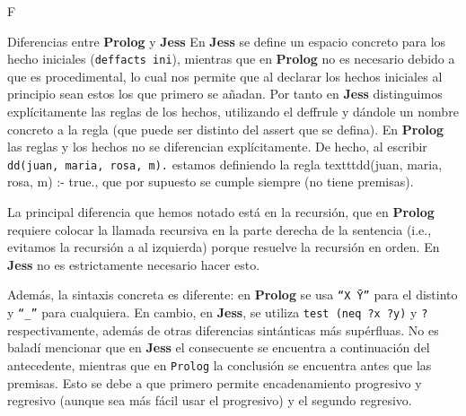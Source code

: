 F\documentclass[11pt, a4paper, spanish, openright, twoside]{book}
\begin{document}
\begin{section}{Diferencias entre \textbf{Prolog} y \textbf{Jess}}
		En \textbf{Jess} se define un espacio concreto para los hecho iniciales (\texttt{deffacts ini}), mientras que en \textbf{Prolog} no es necesario debido a que es procedimental, lo cual nos permite que 
		al declarar los hechos iniciales al principio sean estos los que primero se añadan.
		Por tanto en \textbf{Jess} distinguimos explícitamente las reglas de los hechos, utilizando el deffrule y dándole un nombre concreto a la regla (que puede ser distinto del assert que se defina). En \textbf{Prolog} las reglas 
		y los hechos no se diferencian explícitamente. De hecho, al escribir  \texttt{dd(juan, maria, rosa, m).} estamos definiendo la regla texttt{dd(juan, maria, rosa, m) :- true.}, que por supuesto se cumple siempre (no tiene premisas).
		
		La principal diferencia que hemos notado está en la recursión, que en \textbf{Prolog} requiere colocar la llamada recursiva en la parte derecha de la sentencia (i.e., evitamos la recursión a al izquierda) porque resuelve la recursión en orden. En \textbf{Jess} no es estrictamente necesario hacer esto.
      
      Además, la sintaxis concreta es diferente: en \textbf{Prolog} se usa \texttt{``X \= Y''} para el distinto y \texttt{``_''} para cualquiera. En cambio, en \textbf{Jess}, se utiliza \texttt{test (neq ?x ?y)} y \texttt{?} respectivamente, además de otras diferencias sintánticas más supérfluas. No es baladí mencionar que en \textbf{Jess} el consecuente se encuentra a continuación del antecedente, mientras que en \texttt{Prolog} la conclusión se encuentra antes que las premisas. Esto se debe a que primero permite encadenamiento progresivo y regresivo (aunque sea más fácil usar el progresivo) y el segundo regresivo.
		

	
\end{section}
	\newpage
\end{document}
